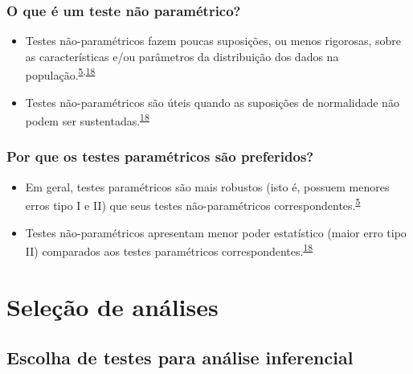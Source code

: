 \documentclass[
]{book}
\begin{document}
\hypertarget{o-que-uxe9-um-teste-nuxe3o-paramuxe9trico}{%
\subsection{O que é um teste não paramétrico?}\label{o-que-uxe9-um-teste-nuxe3o-paramuxe9trico}}

\begin{itemize}
\item
  Testes não-paramétricos fazem poucas suposições, ou menos rigorosas, sobre as características e/ou parâmetros da distribuição dos dados na população.\textsuperscript{\protect\hyperlink{ref-vetter2017}{5},\protect\hyperlink{ref-Ali2016}{18}}
\item
  Testes não-paramétricos são úteis quando as suposições de normalidade não podem ser sustentadas.\textsuperscript{\protect\hyperlink{ref-Ali2016}{18}}
\end{itemize}

\hypertarget{por-que-os-testes-paramuxe9tricos-suxe3o-preferidos}{%
\subsection{Por que os testes paramétricos são preferidos?}\label{por-que-os-testes-paramuxe9tricos-suxe3o-preferidos}}

\begin{itemize}
\item
  Em geral, testes paramétricos são mais robustos (isto é, possuem menores erros tipo I e II) que seus testes não-paramétricos correspondentes.\textsuperscript{\protect\hyperlink{ref-vetter2017}{5}}
\item
  Testes não-paramétricos apresentam menor poder estatístico (maior erro tipo II) comparados aos testes paramétricos correspondentes.\textsuperscript{\protect\hyperlink{ref-Ali2016}{18}}
\end{itemize}

\hypertarget{selecao-analise}{%
\chapter{\texorpdfstring{\textbf{Seleção de análises}}{Seleção de análises}}\label{selecao-analise}}

\hypertarget{escolha-analise-inferencial}{%
\section{Escolha de testes para análise inferencial}\label{escolha-analise-inferencial}}
\end{document}
